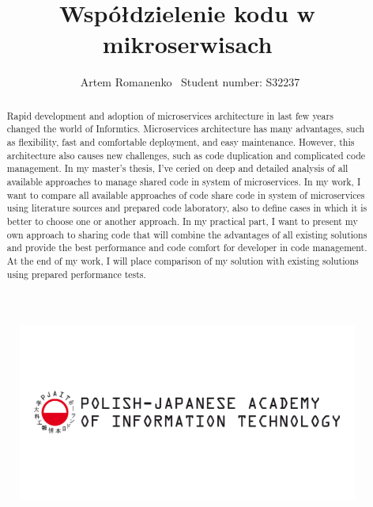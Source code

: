 \documentclass[runningheads,12pt]{llncs} \usepackage{graphicx} \usepackage{todonotes} \usepackage{fancyhdr} \usepackage{lipsum} \usepackage[T1]{fontenc} \usepackage[provide=*,english,polish]{babel}
\begin{document}
\title{Współdzielenie kodu w mikroserwisach} \subtitle{}

\author{\ Artem Romanenko \ Student number: S32237 \inst{}} \authorrunning{ }  

\thispagestyle{fancy}

\begin{figure}[t!] \centering \includegraphics[width=\linewidth]{images/Logo_EN_1.png} \label{fig:my_label} \end{figure}

 

\clearpage

\makeatletter \renewcommand*\l@author[2]{} \renewcommand*\l@title[2]{} \makeatletter

 \begin{abstract} Rapid development and adoption of microservices architecture in last few years changed the world of Informtics. Microservices architecture has many advantages, such as flexibility, fast and comfortable deployment, and easy maintenance. However, this architecture also causes new challenges, such as code duplication and complicated code management. In my master's thesis, I've ceried on deep and detailed analysis of all available approaches to manage shared code in system of microservices. In my work, I want to compare all available approaches of code share code in system of microservices using literature sources and prepared code laboratory, also to define cases in which it is better to choose one or another approach. In my practical part, I want to present my own approach to sharing code that will combine the advantages of all existing solutions and provide the best performance and code comfort for developer in code management. At the end of my work, I will place comparison of my solution with existing solutions using prepared performance tests.  \end{abstract}
\end{document}
